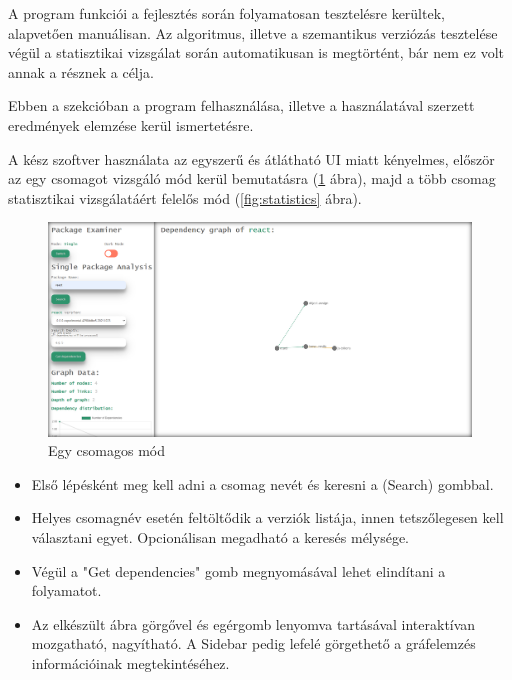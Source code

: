 
A program funkciói a fejlesztés során folyamatosan tesztelésre kerültek, alapvetően manuálisan. Az algoritmus, illetve a szemantikus verziózás tesztelése végül a statisztikai vizsgálat során automatikusan is megtörtént, bár nem ez volt annak a résznek a célja.

Ebben a szekcióban a program felhasználása, illetve a használatával szerzett eredmények elemzése kerül ismertetésre.


A kész szoftver használata az egyszerű és átlátható UI miatt kényelmes, először az egy csomagot vizsgáló mód kerül bemutatásra (\ref{fig:examiner} ábra), majd a több csomag statisztikai vizsgálatáért felelős mód (\ref{fig:statistics} ábra).

\begin{figure}[!h]
	\centering
	\includegraphics[scale=0.2]{images/examiner.png}
	\caption{Egy csomagos mód}
	\label{fig:examiner}
\end{figure}

\begin{itemize}
	\item Első lépésként meg kell adni a csomag nevét és keresni a (Search) gombbal.
	\item Helyes csomagnév esetén feltöltődik a verziók listája, innen tetszőlegesen kell választani egyet. Opcionálisan megadható a keresés mélysége.
	\item Végül a "Get dependencies" gomb megnyomásával lehet elindítani a folyamatot.
	\item Az elkészült ábra görgővel és egérgomb lenyomva tartásával interaktívan mozgatható, nagyítható. A Sidebar pedig lefelé görgethető a gráfelemzés információinak megtekintéséhez.
\end{itemize}

